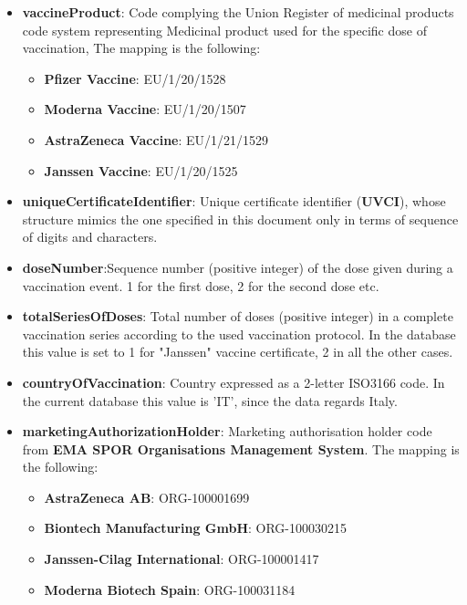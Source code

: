 \documentclass{article}[IEEEtran]
\begin{document}
\begin{itemize}
        \item \textbf{vaccineProduct}: Code complying the Union Register of medicinal products code system representing Medicinal product used for the specific dose of vaccination, The mapping is the following:
        
        \begin{itemize}
            \item \textbf{Pfizer Vaccine}: EU/1/20/1528
            \item \textbf{Moderna Vaccine}: EU/1/20/1507
            \item \textbf{AstraZeneca Vaccine}: EU/1/21/1529
            \item \textbf{Janssen Vaccine}: EU/1/20/1525 
        \end{itemize}
        
        \item \textbf{uniqueCertificateIdentifier}: Unique certificate identifier (\textbf{UVCI}), whose structure mimics the one specified in this document only in terms of sequence of digits and characters.
        
        \item \textbf{doseNumber}:Sequence number (positive integer) of the dose given during a vaccination event. 1 for the first dose, 2 for the second dose etc.
        
        \item \textbf{totalSeriesOfDoses}: Total number of doses (positive integer) in a complete vaccination series according to the used vaccination protocol. In the database this value is set to 1 for "Janssen" vaccine certificate, 2 in all the other cases.
        
        \item \textbf{countryOfVaccination}: Country expressed as a 2-letter ISO3166 code. In the current database this value is 'IT', since the data regards Italy.
        
        \item \textbf{marketingAuthorizationHolder}: Marketing authorisation holder code from \textbf{EMA SPOR Organisations Management System}. The mapping is the following:
        
        \begin{itemize}
            \item  \textbf{AstraZeneca AB}: ORG-100001699
            \item  \textbf{Biontech Manufacturing GmbH}: ORG-100030215
            \item  \textbf{Janssen-Cilag International}: ORG-100001417
            \item  \textbf{Moderna Biotech Spain}: ORG-100031184
        \end{itemize}
        

\end{itemize}
\end{document}
